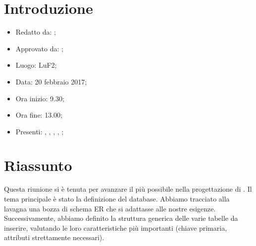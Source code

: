 \section{Introduzione}

	\begin{itemize}
		\item Redatto da: \MC;
		\item Approvato da: \AS;
		\item Luogo: LuF2;
		\item Data: 20 febbraio 2017;
		\item Ora inizio: 9.30;
		\item Ora fine: 13.00;
		\item Presenti: \AS, \DAN, \DS, \MC, \NS;		
	\end{itemize}

\section{Riassunto}
Questa riunione si è tenuta per avanzare il più possibile nella progettazione di \progetto. Il tema principale è stato la definizione del database. Abbiamo tracciato alla lavagna una bozza di schema ER che si adattasse alle nostre esigenze. Successivamente, abbiamo definito la struttura generica delle varie tabelle da inserire, valutando le loro caratteristiche più importanti (chiave primaria, attributi strettamente necessari).
